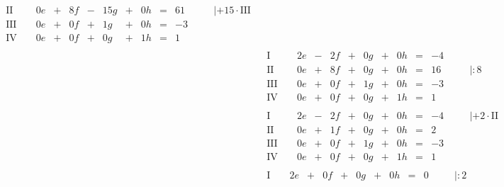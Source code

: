 \begin{exercise}
\begin{minipage}[t]{0.49\linewidth}
\begin{align*}
\begin{array}{r|rrrrrrrrrrrl}
         \text{II}{\,} & {\,} & \num{0}e & + & \num{8}f & - & \num{15}g & + & \num{0}h & = & \num{61} & {\quad} & |+\num{15}\cdot\text{III} \\
        \text{III}{\,} & {\,} & \num{0}e & + & \num{0}f & + &  \num{1}g & + & \num{0}h & = & -\num{3} & {\quad} &                           \\
         \text{IV}{\,} & {\,} & \num{0}e & + & \num{0}f & + &  \num{0}g & + & \num{1}h & = &  \num{1} & {\quad} &
        \end{array}
        \\[1ex]&
        \begin{array}{r|rrrrrrrrrrrl}
          \text{I}{\,} & {\,} & \num{2}e & - & \num{2}f & + & \num{0}g & + & \num{0}h & = & -\num{4} & {\quad} &           \\
         \text{II}{\,} & {\,} & \num{0}e & + & \num{8}f & + & \num{0}g & + & \num{0}h & = & \num{16} & {\quad} & |:\num{8} \\
        \text{III}{\,} & {\,} & \num{0}e & + & \num{0}f & + & \num{1}g & + & \num{0}h & = & -\num{3} & {\quad} &           \\
         \text{IV}{\,} & {\,} & \num{0}e & + & \num{0}f & + & \num{0}g & + & \num{1}h & = &  \num{1} & {\quad} &
        \end{array}
        \\[1ex]&
        \begin{array}{r|rrrrrrrrrrrl}
          \text{I}{\,} & {\,} & \num{2}e & - & \num{2}f & + & \num{0}g & + & \num{0}h & = & -\num{4} & {\quad} & |+\num{2}\cdot\text{II} \\
         \text{II}{\,} & {\,} & \num{0}e & + & \num{1}f & + & \num{0}g & + & \num{0}h & = &  \num{2} & {\quad} &                         \\
        \text{III}{\,} & {\,} & \num{0}e & + & \num{0}f & + & \num{1}g & + & \num{0}h & = & -\num{3} & {\quad} &                         \\
         \text{IV}{\,} & {\,} & \num{0}e & + & \num{0}f & + & \num{0}g & + & \num{1}h & = &  \num{1} & {\quad} &
        \end{array}
        \\[1ex]&
        \begin{array}{r|rrrrrrrrrrrl}
          \text{I}{\,} & {\,} & \num{2}e & + & \num{0}f & + & \num{0}g & + & \num{0}h & = &  \num{0} & {\quad} & |:\num{2} \\

\end{array}
\end{align*}
\end{minipage}
\end{exercise}
